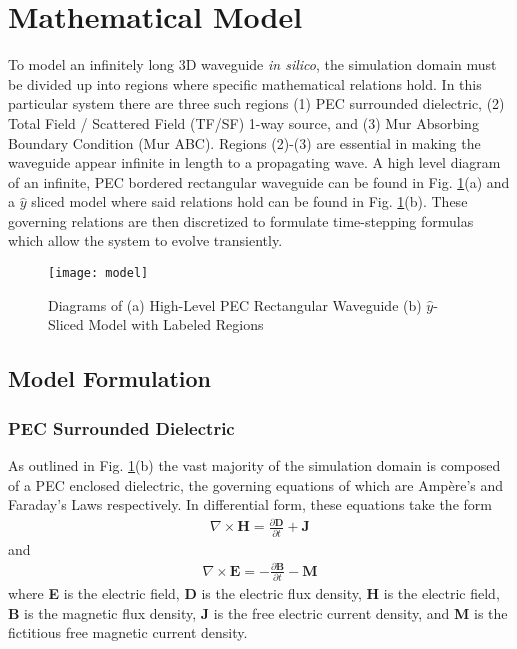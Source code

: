 \section{Mathematical Model}
\label{sec:mathmod}

To model an infinitely long 3D waveguide \textit{in silico}, the simulation domain must be divided up into regions where specific mathematical relations hold. In this particular system there are three such regions (1) PEC surrounded dielectric, (2) Total Field / Scattered Field (TF/SF) 1-way source, and (3) Mur Absorbing Boundary Condition (Mur ABC). Regions (2)-(3) are essential in making the waveguide appear infinite in length to a propagating wave. A high level diagram of an infinite, PEC bordered rectangular waveguide can be found in Fig. \ref{fig:model}(a) and a $\hat{y}$ sliced model where said relations hold can be found in Fig. \ref{fig:model}(b). These governing relations are then discretized to formulate time-stepping formulas which allow the system to evolve transiently.

\begin{figure}[t!]  
	\centering
	\texttt{[image: model]} 
	\caption{Diagrams of (a) High-Level PEC Rectangular Waveguide (b) $\hat{y}$-Sliced Model with Labeled Regions}
	\label{fig:model}
\end{figure}

\subsection{Model Formulation}
\label{subsec:model-formulation}

\subsubsection{PEC Surrounded Dielectric}
\label{subsec:dielectric-formulation}

As outlined in Fig. \ref{fig:model}(b) the vast majority of the simulation domain is composed of a PEC enclosed dielectric, the governing equations of which are Amp\`{e}re's and Faraday's Laws respectively. In differential form, these equations take the form 
\begin{align}
    \nabla\times\textbf{H} = \frac{\partial\textbf{D}}{\partial t} + \textbf{J}
    \label{eq:ampere}
\end{align}
and 
\begin{align}
    \nabla\times\textbf{E}=-\frac{\partial\textbf{B}}{\partial t} - \textbf{M}
    \label{eq:faraday}
\end{align}
where \textbf{E} is the electric field, \textbf{D} is the electric flux density, \textbf{H} is the electric field, \textbf{B} is the magnetic flux density, \textbf{J} is the free electric current density, and \textbf{M} is the fictitious free magnetic current density.

